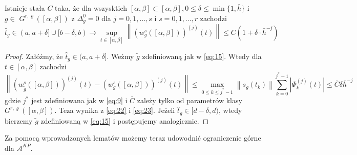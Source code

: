 \documentclass[oik, pdftex, robocza, man]{mgrwms}
\begin{document}
    \begin{lemma} \label{lem:3}
        Istnieje stała $C$ taka, że dla wszysktich $[\alpha, \beta] \subset[\alpha, \beta], 0 \leq \delta \leq \min \{1, \bar{h}\}$ i $g \in$ $G^{r, \varrho}([\alpha, \beta])$ z $\Delta_{g}^{0}=0$ dla $j=0,1, \ldots, s$ i $s=0,1, \ldots, r$ zachodzi
        \begin{equation*}
            \hat{t}_{g} \in(a, a+\delta] \cup[b-\delta, b) \longrightarrow \sup _{t \in[\alpha, \beta]}\left\|\left(w_{g}^{s}([\alpha, \beta])\right)^{(j)}(t)\right\| \leq C\left(1+\delta \cdot \bar{h}^{-j}\right)
        \end{equation*}
    \end{lemma}
    \begin{proof}
        Załóżmy, że $\hat{t}_{g} \in (a, a+\delta]$. Weżmy $\tilde{g}$ zdefiniowaną jak w \eqref{eq:15}. Wtedy dla $t \in[\alpha, \beta]$ zachodzi
        \begin{equation} \label{eq:24}
            \left\|\left(w_{\tilde{g}}^{s}([\alpha, \beta])\right)^{(j)}(t)-\left(w_{g}^{s}([\alpha, \beta])\right)^{(j)}(t)\right\| \leq \max _{0 \leq k \leq j^{*}-1}\left\|s_{g}\left(t_{k}\right)\right\| \sum_{k=0}^{j^{*}-1}\left|\Phi_{k}^{(j)}(t)\right| \leq \bar{C} \delta \bar{h}^{-j}
        \end{equation}
        gdzie $j^{*}$ jest zdefiniowana jak w \eqref{eq:9} i $\bar{C}$  zależy tylko od parametrów klasy $G^{r, \varrho}([\alpha, \beta])$. Teza wynika z \eqref{eq:22} i \eqref{eq:23}. Jeżeli $\hat{t}_{g} \in[d-\delta, d)$, wtedy bierzemy $\tilde{g}$ zdefiniowaną w \eqref{eq:15} i postępujemy analogicznie.
    \end{proof}

    Za pomocą wprowadzonych lematów możemy teraz udowodnić ograniczenie górne dla $\mathcal{A}^{KP}$.
\end{document}
